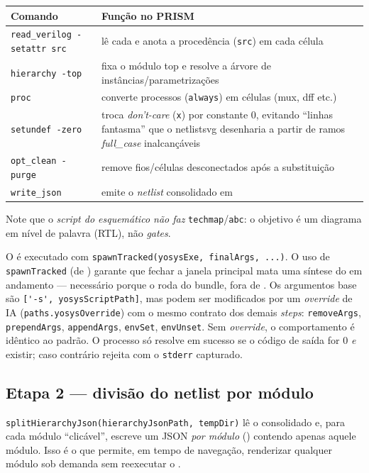 \begin{tabularx}{\linewidth}{Y Z}
\toprule
\textbf{Comando} & \textbf{Função no PRISM} \\
\midrule
\lstinline|read_verilog -setattr src| & lê cada  e anota a procedência (\lstinline|src|) em cada célula \\
\lstinline|hierarchy -top| & fixa o módulo top e resolve a árvore de instâncias/parametrizações \\
\lstinline|proc| & converte processos (\lstinline|always|) em células (mux, dff etc.) \\
\lstinline|setundef -zero| & troca \emph{don't-care} (\lstinline|x|) por constante 0, evitando \enquote{linhas fantasma} que o netlistsvg desenharia a partir de ramos \emph{full\_case} inalcançáveis \\
\lstinline|opt_clean -purge| & remove fios/células desconectados após a substituição \\
\lstinline|write_json| & emite o \emph{netlist} consolidado em  \\
\bottomrule
\end{tabularx}

Note que o \emph{script do esquemático não faz} \lstinline|techmap|/\lstinline|abc|:
o objetivo é um diagrama em nível de palavra (RTL), não \emph{gates}.

O  é executado com \lstinline|spawnTracked(yosysExe, finalArgs, ...)|.
O uso de \lstinline|spawnTracked| (de ) garante
que fechar a janela principal mata uma síntese do  em andamento ---
necessário porque o  roda do  bundle, fora de
. Os argumentos base são \lstinline|['-s', yosysScriptPath]|, mas
podem ser modificados por um \emph{override} de IA
(\lstinline|paths.yosysOverride|) com o mesmo contrato dos demais \emph{steps}:
\lstinline|removeArgs|, \lstinline|prependArgs|, \lstinline|appendArgs|,
\lstinline|envSet|, \lstinline|envUnset|. Sem \emph{override}, o comportamento é
idêntico ao padrão. O processo só resolve em sucesso se o código de saída for 0
\emph{e}  existir; caso contrário rejeita com o
\lstinline|stderr| capturado.

\subsection{Etapa 2 --- divisão do netlist por módulo}

\lstinline|splitHierarchyJson(hierarchyJsonPath, tempDir)| lê o
 consolidado e, para cada módulo \enquote{clicável}, escreve
um JSON \emph{por módulo} () contendo apenas aquele
módulo. Isso é o que permite, em tempo de navegação, renderizar qualquer módulo
sob demanda sem reexecutar o .

